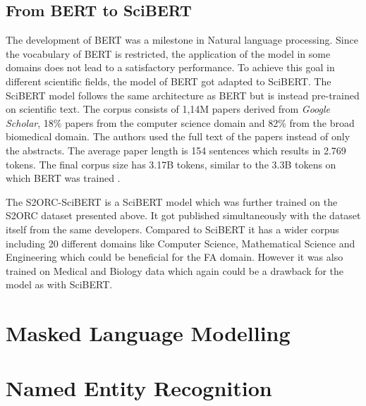 \subsection{From BERT to SciBERT}
The development of BERT was a milestone in Natural language processing. Since the vocabulary of BERT is restricted, the application of the model in some domains does not lead to a satisfactory performance. To achieve this goal in different scientific fields, the model of BERT got adapted to SciBERT. The SciBERT model follows the same architecture as BERT but is instead pre-trained on scientific text. The corpus consists of 1,14M papers derived from \textit{Google Scholar}, 18\% papers from the computer science domain and 82\% from the broad biomedical domain. The authors used the full text of the papers instead of only the abstracts. The average paper length is 154 sentences which results in 2.769 tokens. The final corpus size has 3.17B tokens, similar to the 3.3B tokens on which BERT was trained \cite{Beltagy}. \newline

The S2ORC-SciBERT is a SciBERT model which was further trained on the S2ORC dataset presented above. It got published simultaneously with the dataset itself from the same developers. Compared to SciBERT it has a wider corpus including 20 different domains like Computer Science, Mathematical Science and Engineering which could be beneficial for the FA domain. However it was also trained on Medical and Biology data which again could be a drawback for the model as with SciBERT.


\section{Masked Language Modelling}
\section{Named Entity Recognition}